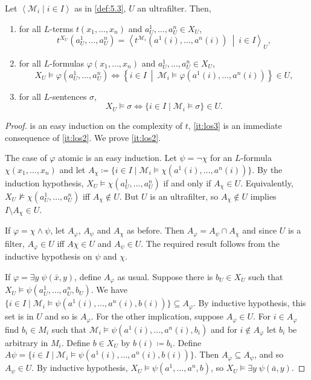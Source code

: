 \documentclass{article}
\let\models\vDash
\begin{document}
\begin{nthm}[Łoś] \label{thm:5.7} 
Let $\left< \mathcal{M}_i \mid i \in I \right>$ as in \cref{def:5.3}, $U$ an ultrafilter. Then,
\begin{enumerate}[label=(\roman*)]
\item for all $L$-terms $t(x_1, \dots, x_n)$ and $a_U^1, \dots, a_U^n \in X_U$, \label{it:los1}
\[
t^{X_U}(a_U^1, \dots, a_U^n) = \left< t^{\mathcal{M}_i} (a^1(i), \dots, a^n(i)) \ \middle|\ i \in I \right>_U,
\] 
\item for all $L$-formulas $\varphi(x_1, \dots, x_n)$ and $a_U^1, \dots, a_U^n \in X_U$, \label{it:los2}
\[
X_U \models \varphi(a_U^1, \dots, a_U^n) \iff \left\{ i \in I \ \middle|\ \mathcal{M}_i \models \varphi(a^1(i), \dots,  a^n(i)) \right\} \in U,
\] 
\item for all $L$-sentences $\sigma$,  \label{it:los3}
\[
X_U \models \sigma \iff \{i \in I \mid \mathcal{M}_i \models \sigma \} \in U.
\] 
\end{enumerate}
\end{nthm}
\begin{proof}
 is an easy induction on the complexity of $t$, \cref{it:los3} is an immediate consequence of \cref{it:los2}. We prove \cref{it:los2}.

The case of $\varphi$ atomic is an easy induction. Let $\psi = \neg \chi$ for an $L$-formula $\chi(x_1, \dots, x_n)$ and let $A_\chi \coloneqq \{i \in I \mid \mathcal{M}_i \models \chi(a^1(i), \dots, a^n(i))\}$. By the induction hypothesis, $X_U \models \chi(a_U^1, \dots, a_U^n)$ if and only if $A_\chi \in U$. Equivalently, $X_U \not\models \chi(a_U^1, \dots, a_U^n)$ iff $A_\chi \not\in U$. But $U$ is an ultrafilter, so $A_\chi \not\in U$ implies $I \setminus A_\chi \in U$.

If $\varphi = \chi \land \psi$, let $A_\varphi$, $A_\psi$ and $A_\chi$ as before. Then $A_\varphi = A_\psi \cap A_\chi$ and since $U$ is a filter, $A_\varphi \in U$ iff $A\chi \in U$ and $A_\psi \in U$. The required result follows from the inductive hypothesis on $\psi$ and $\chi$.

If $\varphi = \exists y \; \psi(\bar x, y)$, define $A_\varphi$ as usual. Suppose there is $b_U \in X_U$ such that $X_U \models \psi(a_U^1, \dots, a_U^n, b_U)$. We have $\{i \in I \mid \mathcal{M}_i \models \psi(a^1(i), \dots, a^n(i),b(i))\} \subseteq A_\varphi$. By inductive hypothesis, this set is in $U$ and so is $A_\varphi$. For the other implication, suppose $A_\varphi \in U$. For $i \in A_\varphi$ find $b_i \in M_i$ such that $\mathcal{M}_i \models \psi(a^1(i), \dots, a^n(i), b_i)$ and for $i \not\in A_\varphi$ let $b_i$ be arbitrary in $M_i$. Define $b \in X_U$ by $b(i) \coloneqq b_i$. Define $A \psi = \{i \in I \mid \mathcal{M}_i \models \psi(a^1(i), \dots, a^n(i),b(i))\}$. Then $A_\varphi \subseteq A_\psi$, and so $A_\psi \in U$. By inductive hypothesis, $X_U \models  \psi(a^1, \dots, a^n, b)$, so $X_U \models \exists y \; \psi(\bar a, y)$.
\end{proof}
\end{document}
